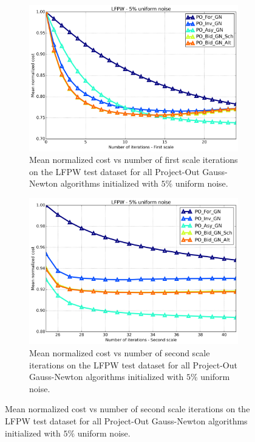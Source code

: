 \begin{figure}[p]
\begin{subfigure}{0.48\textwidth}
	\end{subfigure}
	\par\bigskip\bigskip
	\begin{subfigure}{0.48\textwidth}
	    \includegraphics[width=\textwidth]{experiments/algorithms/po_gn/mean_cost_vs_iters1_po_gn_5.png}
	    \caption{Mean normalized cost vs number of first scale iterations on the LFPW test dataset for all Project-Out Gauss-Newton algorithms initialized with $5\%$ uniform noise.}
	    \label{fig:mean_cost_vs_iters1_bpo_gn_5}
	\end{subfigure}
	\hfill
	\begin{subfigure}{0.48\textwidth}
	    \includegraphics[width=\textwidth]{experiments/algorithms/po_gn/mean_cost_vs_iters2_po_gn_5.png}
	    \caption{Mean normalized cost vs number of second scale iterations on the LFPW test dataset for all Project-Out Gauss-Newton algorithms initialized with $5\%$ uniform noise.}

\end{subfigure}
\end{figure}
